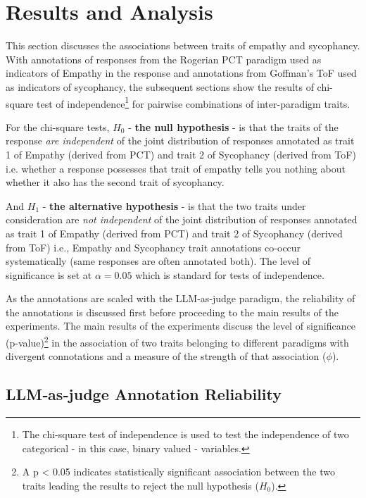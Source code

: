 \chapter{Results and Analysis}\label{sec:results}

This section discusses the associations between traits of empathy and sycophancy. With annotations of responses from the Rogerian PCT paradigm used as indicators of Empathy in the response and annotations from Goffman's ToF used as indicators of sycophancy, the subsequent sections show the results of chi-square test of independence\footnote{The chi-square test of independence is used to test the independence of two categorical - in this case, binary valued - variables.} for pairwise combinations of inter-paradigm traits. 

For the chi-square tests, $H_0$ - \textbf{the null hypothesis} - is that the traits of the response \textit{are independent} of the joint distribution of responses annotated as {trait 1 of Empathy (derived from PCT)} and {trait 2 of Sycophancy (derived from ToF)} i.e. whether a response possesses that trait of empathy tells you nothing about whether it also has the second trait of sycophancy.

And $H_1$ - \textbf{the alternative hypothesis} - is that the two traits under consideration are \textit{not independent} of the joint distribution of responses annotated as  {trait 1 of Empathy (derived from PCT)} and {trait 2 of Sycophancy (derived from ToF)} i.e., Empathy and Sycophancy trait annotations co-occur systematically (same responses are often annotated both). The level of significance is set at $\alpha = 0.05$ which is standard for tests of independence.

As the annotations are scaled with the LLM‑as‑judge paradigm, the reliability of the annotations is discussed first before proceeding to the main results of the experiments. The main results of the experiments discuss the level of significance (p-value)\footnote{A p < 0.05 indicates statistically significant association between the two traits leading the results to reject the null hypothesis ($H_0$).} in the association of two traits belonging to different paradigms with divergent connotations and a measure of the strength of that association ($\phi$). 

\section{LLM‑as‑judge Annotation Reliability}

